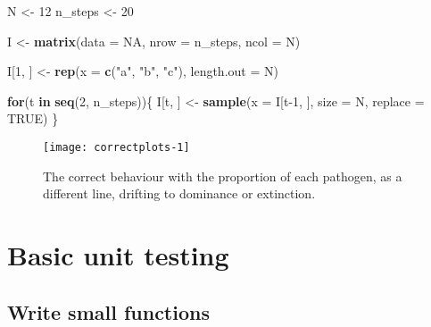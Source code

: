 \documentclass[]{elsarticle} %
\newenvironment{Shaded}{\begin{snugshade}}{\end{snugshade}}
\newcommand{\ControlFlowTok}[1]{\textcolor[rgb]{0.13,0.29,0.53}{\textbf{#1}}}
\newcommand{\DataTypeTok}[1]{\textcolor[rgb]{0.13,0.29,0.53}{#1}}
\newcommand{\DecValTok}[1]{\textcolor[rgb]{0.00,0.00,0.81}{#1}}
\newcommand{\KeywordTok}[1]{\textcolor[rgb]{0.13,0.29,0.53}{\textbf{#1}}}
\newcommand{\NormalTok}[1]{#1}
\newcommand{\OtherTok}[1]{\textcolor[rgb]{0.56,0.35,0.01}{#1}}
\newcommand{\StringTok}[1]{\textcolor[rgb]{0.31,0.60,0.02}{#1}}
\begin{document}
\begin{Shaded}
\begin{Highlighting}[]
\NormalTok{N <-}\StringTok{ }\DecValTok{12}
\NormalTok{n_steps <-}\StringTok{ }\DecValTok{20}

\NormalTok{I <-}\StringTok{ }\KeywordTok{matrix}\NormalTok{(}\DataTypeTok{data =} \OtherTok{NA}\NormalTok{, }\DataTypeTok{nrow =}\NormalTok{ n_steps, }\DataTypeTok{ncol =}\NormalTok{ N)}

\NormalTok{I[}\DecValTok{1}\NormalTok{, ] <-}\StringTok{ }\KeywordTok{rep}\NormalTok{(}\DataTypeTok{x =} \KeywordTok{c}\NormalTok{(}\StringTok{"a"}\NormalTok{, }\StringTok{"b"}\NormalTok{, }\StringTok{"c"}\NormalTok{), }\DataTypeTok{length.out =}\NormalTok{ N)}

\ControlFlowTok{for}\NormalTok{(t }\ControlFlowTok{in} \KeywordTok{seq}\NormalTok{(}\DecValTok{2}\NormalTok{, n_steps))\{}
\NormalTok{  I[t, ] <-}\StringTok{ }\KeywordTok{sample}\NormalTok{(}\DataTypeTok{x =}\NormalTok{ I[t}\DecValTok{-1}\NormalTok{, ], }\DataTypeTok{size =}\NormalTok{ N, }\DataTypeTok{replace =} \OtherTok{TRUE}\NormalTok{)}
\NormalTok{\}}
\end{Highlighting}
\end{Shaded}

\begin{figure}[h]

{\centering \texttt{[image: correctplots-1]} 

}

\caption{The correct behaviour with the proportion of each pathogen, as a different line, drifting to dominance or extinction.}\label{fig:correctplots}
\end{figure}

\hypertarget{basic-unit-testing}{%
\section{Basic unit testing}\label{basic-unit-testing}}

\hypertarget{compactfuns}{%
\subsection*{Write small functions}\label{compactfuns}}
\end{document}

